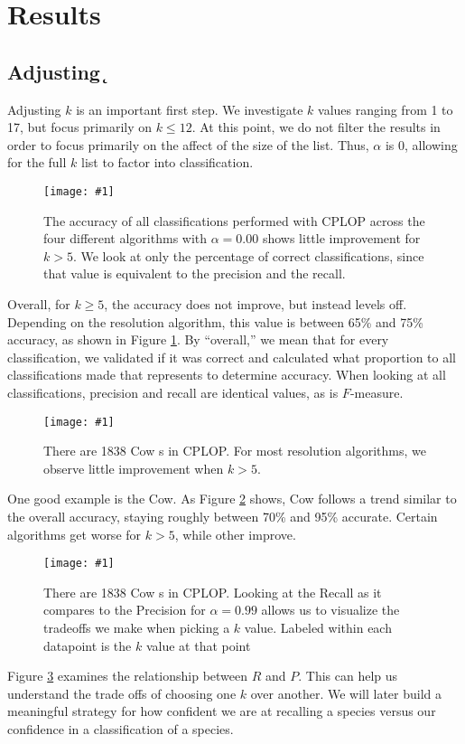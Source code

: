 \section{Results}\label{sec:results:krap}
\newcommand{\krapfigurewidth}{\linewidth}
\newcommand{\krapfigure}[1]{\texttt{[image: \#1]}}

\subsection{Adjusting \k{}}
Adjusting $k$ is an important first step. We investigate $k$ values ranging from 1 to 17, but focus primarily on $k \leq 12$. At this point, we do not filter the results in order to focus primarily on the affect of the size of the \knn{} list. Thus, $\alpha$ is 0, allowing for the full $k$ list to factor into classification.

\begin{figure}[t]
\centering
\krapfigure{figures/krap/Overall-ALL-metrics-12-0_000_new}
\caption{The accuracy  of all classifications performed with CPLOP across the four different algorithms with $\alpha=0.00$ shows little improvement for $k>5$. We look at only the percentage of correct classifications, since that value is equivalent to the precision and the recall.}
\label{fig:k_overall}
\end{figure}
Overall, for $k\geq5$, the accuracy does not improve, but instead levels off. Depending on the resolution algorithm, this value is between 65\% and 75\% accuracy, as shown in Figure \ref{fig:k_overall}. By ``overall,'' we mean that for every classification, we validated if it was correct and calculated what proportion to all classifications made that represents to determine accuracy. When looking at all classifications, precision and recall are identical values, as is $F$-measure.


\begin{figure}[t]
\centering
\krapfigure{figures/krap/Cow-ALL-metrics-12-0_000}
\caption{There are 1838 Cow \isol{}s in CPLOP. For most resolution algorithms, we observe little improvement when $k>5$.}
\label{fig:k_cow}
\end{figure}
One good example is the Cow. As Figure \ref{fig:k_cow} shows, Cow follows a trend similar to the overall accuracy, staying roughly between 70\% and 95\% accurate. Certain algorithms get worse for $k>5$, while other improve.

\begin{figure}[t]
\centering
\krapfigure{figures/krap/Cow-ALL-pvr-12-0_000}
\caption{There are 1838 Cow \isol{}s in CPLOP. Looking at the Recall as it compares to the Precision for $\alpha=0.99$ allows us to visualize the tradeoffs we make when picking a $k$ value. Labeled within each datapoint is the $k$ value at that point}
\label{fig:k_cow_pvr}
\end{figure}
Figure \ref{fig:k_cow_pvr} examines the relationship between $R$ and $P$. This can help us understand the trade offs of choosing one $k$ over another. We will later build a meaningful strategy for how confident we are at recalling a species versus our confidence in a classification of a species.


